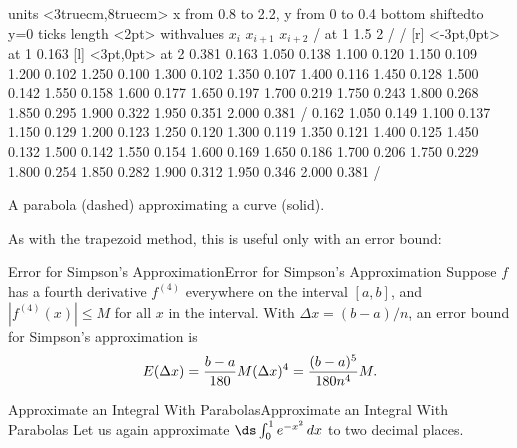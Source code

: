 \figure[H]
\centerline{\vbox{\beginpicture
\normalgraphs
\setcoordinatesystem units <3truecm,8truecm>
\setplotarea x from 0.8 to 2.2, y from 0 to 0.4
\axis bottom shiftedto y=0 ticks length <2pt> 
  withvalues {$x_i$} {$x_{i+1}$} {$x_{i+2}$} / at 1 1.5 2 / /
 [r] <-3pt,0pt> at 1 0.163
 [l] <3pt,0pt> at 2 0.381
\setquadratic
{} 0.163 1.050 0.138 1.100 0.120 1.150 0.109 1.200 0.102
1.250 0.100 1.300 0.102 1.350 0.107 1.400 0.116 1.450 0.128
1.500 0.142 1.550 0.158 1.600 0.177 1.650 0.197 1.700 0.219
1.750 0.243 1.800 0.268 1.850 0.295 1.900 0.322 1.950 0.351
2.000 0.381 /
\setdashes <2pt>
 0.162 1.050 0.149 1.100 0.137 1.150 0.129 1.200 0.123
1.250 0.120 1.300 0.119 1.350 0.121 1.400 0.125 1.450 0.132
1.500 0.142 1.550 0.154 1.600 0.169 1.650 0.186 1.700 0.206
1.750 0.229 1.800 0.254 1.850 0.282 1.900 0.312 1.950 0.346
2.000 0.381 /
\endpicture}}
\caption{\label{fig:one parabola}
A parabola (dashed) approximating a curve (solid).}
\endfigure

\noindent As with the trapezoid method, this is useful only with an error
bound:

\begin{theorem}{Error for Simpson's Approximation}{Error for Simpson's Approximation}\label{Error for Simpson's Approximation}
Suppose $f$ has a fourth derivative $f^{(4)}$ everywhere on the
interval $[a,b]$, and $|f^{(4)}(x)|\le M$ for all $x$ in the
interval. With $\Delta x= (b-a)/n$, an error bound for Simpson's
approximation is
$$
  E(\Delta x) = {b-a\over180}M(\Delta x)^4={(b-a)^5\over 180n^4}M.
$$
\end{theorem}

\begin{example}{Approximate an Integral With Parabolas}{Approximate an Integral With Parabolas}\label{Approximate an Integral With Parabolas}
Let us again approximate $\ds\int_0^1 e^{-x^2}\,dx$ to two
decimal places.  
\end{example}

